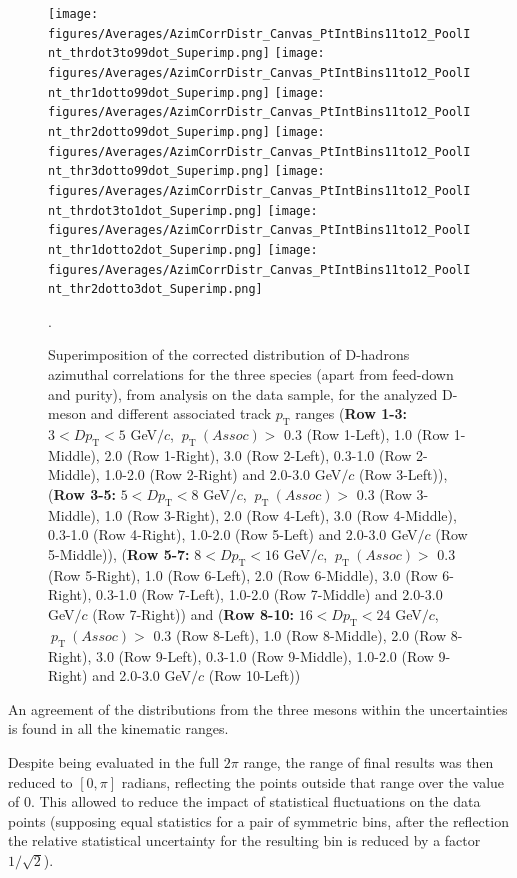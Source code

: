 \begin{figure}
\centering
{\texttt{[image: figures/Averages/AzimCorrDistr\_Canvas\_PtIntBins11to12\_PoolInt\_thrdot3to99dot\_Superimp.png]}}
{\texttt{[image: figures/Averages/AzimCorrDistr\_Canvas\_PtIntBins11to12\_PoolInt\_thr1dotto99dot\_Superimp.png]}}
{\texttt{[image: figures/Averages/AzimCorrDistr\_Canvas\_PtIntBins11to12\_PoolInt\_thr2dotto99dot\_Superimp.png]}}
{\texttt{[image: figures/Averages/AzimCorrDistr\_Canvas\_PtIntBins11to12\_PoolInt\_thr3dotto99dot\_Superimp.png]}}
{\texttt{[image: figures/Averages/AzimCorrDistr\_Canvas\_PtIntBins11to12\_PoolInt\_thrdot3to1dot\_Superimp.png]}}
{\texttt{[image: figures/Averages/AzimCorrDistr\_Canvas\_PtIntBins11to12\_PoolInt\_thr1dotto2dot\_Superimp.png]}}
{\texttt{[image: figures/Averages/AzimCorrDistr\_Canvas\_PtIntBins11to12\_PoolInt\_thr2dotto3dot\_Superimp.png]}}
\caption{Superimposition of the corrected distribution of D-hadrons azimuthal correlations for the three species (apart from feed-down and purity), from analysis on the data sample, for the analyzed D-meson and different associated track $p_\text{T}$ ranges (\textbf{Row 1-3:} $3 < D p_\text{T} < 5$ GeV$/c$, $ \ p_\text{T}~(Assoc)>$ 0.3 (Row 1-Left), 1.0 (Row 1-Middle), 2.0 (Row 1-Right), 3.0 (Row 2-Left), 0.3-1.0 (Row 2-Middle), 1.0-2.0 (Row 2-Right) and 2.0-3.0 GeV$/c$ (Row 3-Left)), (\textbf{Row 3-5:} $5 < D p_\text{T} < 8$ GeV$/c$, $ \ p_\text{T}~(Assoc)>$ 0.3 (Row 3-Middle), 1.0 (Row 3-Right), 2.0 (Row 4-Left), 3.0 (Row 4-Middle), 0.3-1.0 (Row 4-Right), 1.0-2.0 (Row 5-Left) and 2.0-3.0 GeV$/c$ (Row 5-Middle)), (\textbf{Row 5-7:} $8 < D p_\text{T} < 16$ GeV$/c$, $ \ p_\text{T}~(Assoc)>$ 0.3 (Row 5-Right), 1.0 (Row 6-Left), 2.0 (Row 6-Middle), 3.0 (Row 6-Right), 0.3-1.0 (Row 7-Left), 1.0-2.0 (Row 7-Middle) and 2.0-3.0 GeV$/c$ (Row 7-Right)) and (\textbf{Row 8-10:} $16 < D p_\text{T} < 24$ GeV$/c$, $ \ p_\text{T}~(Assoc)>$ 0.3 (Row 8-Left), 1.0 (Row 8-Middle), 2.0 (Row 8-Right), 3.0 (Row 9-Left), 0.3-1.0 (Row 9-Middle), 1.0-2.0 (Row 9-Right) and 2.0-3.0 GeV$/c$ (Row 10-Left))}.
\label{fig:Data_Res_D0DpDs}
\end{figure}

An agreement of the distributions from the three mesons within the uncertainties is found in all the kinematic ranges.

Despite being evaluated in the full $2\pi$ range, the range of final results was then reduced to $[0,\pi]$ radians, reflecting the points outside that range over the value of 0. This allowed to reduce the impact of statistical fluctuations on the data points (supposing equal statistics for a pair of symmetric bins, after the reflection the relative statistical uncertainty for the resulting bin is reduced by a factor $1/\sqrt{2}$).


